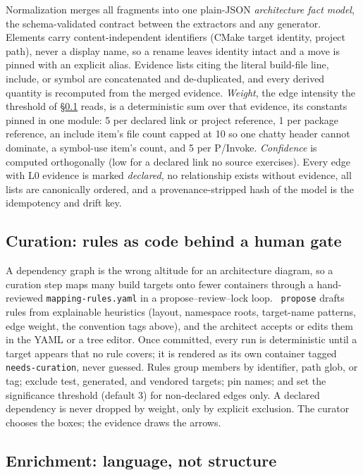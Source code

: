 Normalization merges all fragments into one plain-JSON \emph{architecture fact model}, the
schema-validated contract between the extractors and any generator. Elements carry
content-independent identifiers (CMake target identity, project path), never a display name, so
a rename leaves identity intact and a move is pinned with an explicit alias. Evidence lists
citing the literal build-file
line, include, or symbol are concatenated and de-duplicated, and every derived quantity is
recomputed from the merged evidence. \emph{Weight}, the edge intensity the threshold of
\S\ref{sec:curate} reads, is a deterministic sum over that evidence, its constants pinned in one
module: 5 per declared link or project reference, 1 per package
reference, an include item's file count capped at 10 so one chatty header cannot dominate, a
symbol-use item's count, and 5 per P/Invoke. \emph{Confidence} is computed orthogonally (low for
a declared link no source exercises). Every edge with L0 evidence is marked \emph{declared}, no
relationship exists without evidence, all lists are canonically ordered, and a
provenance-stripped hash of the model is the idempotency and drift key.

\subsection{Curation: rules as code behind a human gate}
\label{sec:curate}

A dependency graph is the wrong altitude for an architecture diagram, so a curation step maps many
build targets onto fewer containers through a hand-reviewed \texttt{mapping-rules.yaml} in a
propose--review--lock loop. \cli~\texttt{propose} drafts rules from explainable heuristics
(layout, namespace roots, target-name patterns, edge weight, the convention tags above), and the
architect accepts or edits them in the YAML or a tree editor. Once committed, every run is
deterministic until a target appears that no rule covers; it is rendered as its own container
tagged \texttt{needs-curation}, never guessed. Rules group members by identifier, path
glob, or tag; exclude test, generated, and vendored targets; pin names; and set the significance
threshold (default 3) for non-declared edges only. A declared dependency is never dropped by
weight, only by explicit exclusion. The curator chooses the boxes; the evidence draws the arrows.

\subsection{Enrichment: language, not structure}
\label{sec:enrich}

